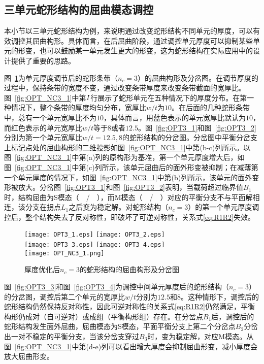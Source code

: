 \subsection{三单元蛇形结构的屈曲模态调控}
本小节以三单元蛇形结构为例，来说明通过改变蛇形结构不同单元的厚度，可以有效调控其屈曲构形。具体而言，在后屈曲阶段，通过调控单元厚度可以抑制某些单元的形变，也可以鼓励某一单元发生更大的形变，这为蛇形结构在实际应用中的设计提供了重要的思路。

图~\ref{fig:OPT3}为单元厚度调节后的蛇形条带（$n_c=3$）的屈曲构形及分岔图。在调节厚度的过程中，保持条带的宽度不变，通过改变条带厚度来改变条带截面的宽厚比。图~\ref{fig:OPT_NC3_1}中第$\rom{1}$行展示了蛇形单元在五种情况下的厚度分布。在第一种情况下，整个条带的厚度均匀分布，宽厚比$w/t$为$10$。在后面的几种蛇形条带中，总有一个单元宽厚比不为$10$，具体而言，用蓝色表示的单元宽厚比默认为$10$，而红色表示的单元宽厚比$w/t$等于$8$或者$12.5$。图~\ref{fig:OPT3_1}和图~\ref{fig:OPT3_2}分别为第一个单元宽厚比$w/t=12.5,8$的蛇形结构的分岔图。分岔图中平衡分岔支上标记点处的屈曲构形的二维投影如图~\ref{fig:OPT_NC3_1}中第(b-c)列所示。以图~\ref{fig:OPT_NC3_1}中第(a)列的原构形为基准，第一个单元厚度增大后，如图~\ref{fig:OPT_NC3_1}中第(c)列所示，该单元屈曲后的面外形变被抑制；在减薄第一个单元厚度的情况下，如图~\ref{fig:OPT_NC3_1}中第(b)列所示，该单元的面外变形被放大。分岔图~\ref{fig:OPT3_1}和图~\ref{fig:OPT3_2}表明，当载荷超过临界值$B_1$时，结构屈曲为S模态（~\blacksquare~/~\blackdiamond~），而M模态（~\bltriangle~/~\Rtriangle~）对应的平衡分支不与平面解相连，该分支在拐点$L_1$之后变为稳定解。对蛇形结构（$n_c=3$）的第一个单元厚度调控后，整个结构失去了反对称性，即破坏了可逆对称性，关系式\eqref{eq:R1R2}失效。
\begin{figure}
	\centering
	{\texttt{[image: OPT3\_1.eps]}}
	{\texttt{[image: OPT3\_2.eps]}}\\
	{\texttt{[image: OPT3\_3.eps]}}
	{\texttt{[image: OPT3\_4.eps]}}\\
	{\texttt{[image: OPT\_NC3\_1.png]}}
	\caption{厚度优化后$n_c=3$的蛇形结构的屈曲构形及分岔图}	
	\label{fig:OPT3}
\end{figure}

图~\ref{fig:OPT3_3}和图~\ref{fig:OPT3_4}为调控中间单元厚度后的蛇形结构（$n_c=3$）的分岔图，调控后第二个单元的宽厚比$w/t$分别为$12.5$和$8$。这种情形下，调控后的蛇形结构仍然保持反对称性，因此可逆对称性的关系式\eqref{eq:R1R2}仍然满足，平衡构形仍成对（自可逆对）或成组（平衡构形组）存在。在分岔点$B_1$后，调控后的蛇形结构发生面外屈曲，屈曲模态为S模态，平面平衡分支上第二个分岔点$B_2$分岔出一对不稳定的平衡分支，当该分岔支穿过$B_3$时，变为稳定解，对应M模态。从图~\ref{fig:OPT_NC3_1}中第(d-e)列可以看出增大厚度会抑制屈曲形变，减小厚度会放大屈曲形变。


